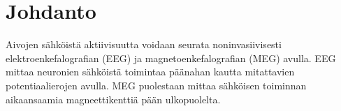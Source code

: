 \section{Johdanto}

Aivojen sähköistä aktiivisuutta voidaan seurata noninvasiivisesti elektroenkefalografian (EEG) ja magnetoenkefalografian (MEG) avulla. EEG mittaa neuronien sähköistä toimintaa päänahan kautta mitattavien potentiaalierojen avulla. MEG puolestaan mittaa sähköisen toiminnan aikaansaamia magneettikenttiä pään ulkopuolelta.

